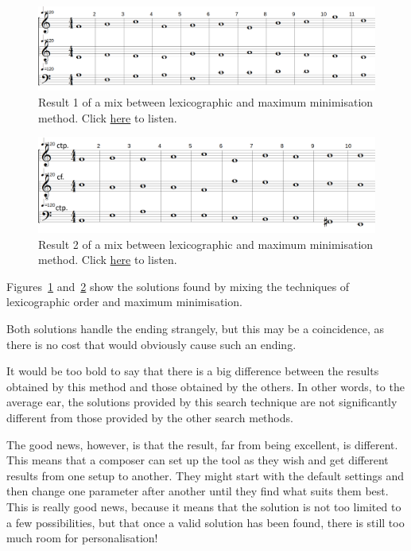 \begin{figure}[h]
    \centering
    \includegraphics[width=1\textwidth]{Images/Experiments/min-1sp.png}
    \caption{Result 1 of a mix between lexicographic and maximum minimisation method. Click \href{https://example.com/}{here} to listen.}
    \label{fig:min-sp}
\end{figure} 
\begin{figure}[h]
    \centering
    \includegraphics[width=1\textwidth]{Images/Experiments/min-1sp0.png}
    \caption{Result 2 of a mix between lexicographic and maximum minimisation method. Click \href{https://youtu.be/GRGE7NN3jNE}{here} to listen.}
    \label{fig:min-sp0}
\end{figure}

Figures~\ref{fig:min-sp} and~\ref{fig:min-sp0} show the solutions found by mixing the techniques of lexicographic order and maximum minimisation.

Both solutions handle the ending strangely, but this may be a coincidence, as there is no cost that would obviously cause such an ending.

It would be too bold to say that there is a big difference between the results obtained by this method and those obtained by the others. In other words, to the average ear, the solutions provided by this search technique are not significantly different from those provided by the other search methods.


The good news, however, is that the result, far from being excellent, is different. This means that a composer can set up the tool as they wish and get different results from one setup to another. They might start with the default settings and then change one parameter after another until they find what suits them best. This is really good news, because it means that the solution is not too limited to a few possibilities, but that once a valid solution has been found, there is still too much room for personalisation!


